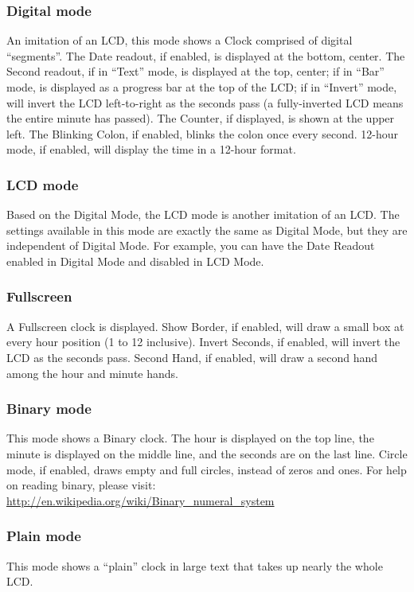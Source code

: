 \subsubsection{Digital mode}
An imitation of an LCD, this mode shows a Clock comprised of digital ``segments''.
The Date readout, if enabled, is displayed at the bottom, center.
The Second readout, if in ``Text'' mode, is displayed at the top, center; if in
``Bar'' mode, is displayed as a progress bar at the top of the LCD; if in
``Invert'' mode, will invert the LCD left-to-right as the seconds pass (a
fully-inverted LCD means the entire minute has passed).
The Counter, if displayed, is shown at the upper left.
The Blinking Colon, if enabled, blinks the colon once every second.
12-hour mode, if enabled, will display the time in a 12-hour format.

\subsubsection{LCD mode}
Based on the Digital Mode, the LCD mode is another imitation of an LCD.
The settings available in this mode are exactly the same as Digital Mode, but
they are independent of Digital Mode. For example, you can have the Date
Readout enabled in Digital Mode and disabled in LCD Mode.

\subsubsection{Fullscreen}
A Fullscreen clock is displayed. Show Border, if enabled, will draw a small
box at every hour position (1 to 12 inclusive).
Invert Seconds, if enabled, will invert the LCD as the seconds pass.
Second Hand, if enabled, will draw a second hand among the hour and minute hands.

\subsubsection{Binary mode}
This mode shows a Binary clock.
The hour is displayed on the top line, the minute is displayed on the middle
line, and the seconds are on the last line.
Circle mode, if enabled, draws empty and full circles, instead of zeros and ones.
For help on reading binary, please visit:
\url{http://en.wikipedia.org/wiki/Binary_numeral_system}

\subsubsection{Plain mode}
This mode shows a ``plain'' clock in large text that takes up nearly the whole LCD.
